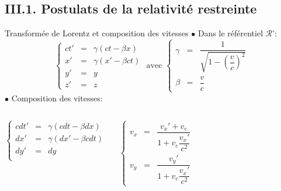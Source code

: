\documentclass{beamer}
\begin{document}
\subsection{III.1. Postulats de la relativité restreinte}
\begin{frame}{Transformée de Lorentz et composition des vitesses}
    $\bullet$ Dans le référentiel $\mathcal{R}$':
\begin{equation}
    \left\{\begin{array}{rcl}
    ct' &=& \gamma\left(ct-\beta x\right)\\
    x'&=&  \gamma\left(x'- \beta ct\right)\\
    y' &=& y\\
    z'&=& z
    \end{array}\right. \text{ avec } \left\{\begin{array}{rcl}\gamma &=&\dfrac{1}{\sqrt{1-(\dfrac{v}{c})^2}} \\ \beta &=& \dfrac{v}{c}\end{array}\right.
\end{equation}
$\bullet$ Composition des vitesses:
\begin{columns}
\begin{equation}
    \left\{\begin{array}{rcl}
        cdt' &=& \gamma\left(cdt-\beta dx\right)\\
        dx'&=&  \gamma\left(dx'- \beta cdt\right)\\
        dy' &=& dy\\
    \end{array}\right.
\end{equation}


\begin{equation}
    \left\{\begin{array}{rcl}
        v_x &=& \dfrac{v_x'+v_{e}}{1+v_e\dfrac{v_x'}{c^2}}\\
        v_y &=& \dfrac{v_y'}{1+v_e\dfrac{v_x'}{c^2}}
    \end{array}\right.
\end{equation}

\end{columns}

\end{frame}
\end{document}
